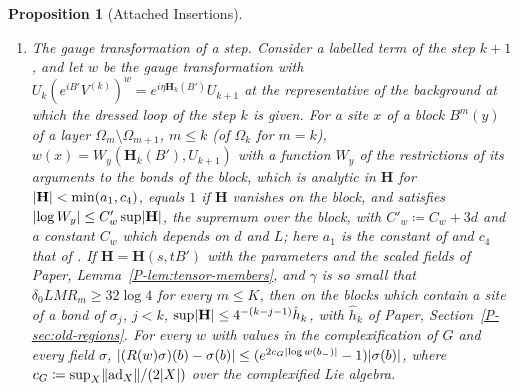 \documentclass[11pt]{preprint}
\DeclarePairedDelimiter{\abs}{\lvert}{\rvert}
\DeclarePairedDelimiter{\norm}{\lVert}{\rVert}
\numberwithin{equation}{section}
\newtheorem{proposition}{Proposition}
\theoremstyle{definition}
\theoremstyle{remark}
\theoremstyle{plain}
\begin{document}
\begin{proposition}[Attached Insertions]
\begin{enumerate}[label=(\roman*)]
\begin{equation}\label{eq:cross-carry}
    \prod_D\Bigl(1 + e^{c_W}w(D)(1 + 2\bar c)\Bigr)\;,
\end{equation}
the product over the insertions of that species present at the step $n$. In particular such an insertion is not increased by its evaluation at $U_{n+1}$, and its parts which the step integrates or merges into new groups have weighted mass at most $2\bar c$ times its own, so that the total weighted mass of the species grows by at most the factor $1 + 2\bar c \leq 2$.
\item \emph{The gauge transformation of a step.} Consider a labelled term of the step $k + 1$, and let $w$ be the gauge transformation with $U_k(e^{iB'}V^{(k)})^w = e^{i\eta\mathbf H_k(B')}U_{k+1}$ at the representative of the background at which the dressed loop of the step $k$ is given. For a site $x$ of a block $B^m(y)$ of a layer $\Omega_m \setminus \Omega_{m+1}$, $m \leq k$ (of $\Omega_k$ for $m = k$), $w(x) = W_y(\mathbf H_k(B'), U_{k+1})$ with a function $W_y$ of the restrictions of its arguments to the bonds of the block, which is analytic in $\mathbf H$ for $\abs{\mathbf H} < \min(a_1, c_4)$, equals $1$ if $\mathbf H$ vanishes on the block, and satisfies $\abs{\log W_y} \leq C'_w\sup\abs{\mathbf H}$, the supremum over the block, with $C'_w \coloneqq C_w + 3d$ and a constant $C_w$ which depends on $d$ and $L$; here $a_1$ is the constant of \cite[p.~266]{BalabanRG1} and $c_4$ that of \cite[Proposition~4, p.~38]{BalabanAVG}. If $\mathbf H = \mathbf H(s, tB')$ with the parameters and the scaled fields of Paper, Lemma~\ref{P-lem:tensor-members}, and $\gamma$ is so small that $\delta_0LMR_m \geq 32\log 4$ for every $m \leq K$, then on the blocks which contain a site of a bond of $\sigma_j$, $j < k$, $\sup\abs{\mathbf H} \leq 4^{-(k-j-1)}\hat h_k$, with $\hat h_k$ of Paper, Section~\ref{P-sec:old-regions}. For every $w$ with values in the complexification of $G$ and every field $\sigma$, $\abs{(R(w)\sigma)(b) - \sigma(b)} \leq (e^{2c_G\abs{\log w(b_-)}} - 1)\abs{\sigma(b)}$, where $c_G \coloneqq \sup_X\norm{\operatorname{ad}_X}/(2\abs X)$ over the complexified Lie algebra.

\end{enumerate}
\end{proposition}
\end{document}
